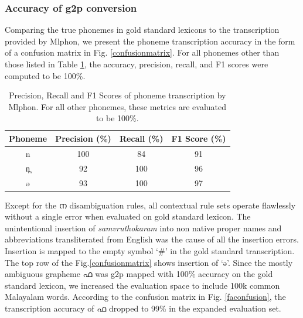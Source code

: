\documentclass{ieeeaccess}
\begin{document}
\subsubsection{Accuracy of g2p conversion }

Comparing the true phonemes in gold standard lexicons to the transcription provided by Mlphon, we present the phoneme transcription accuracy in the form of a confusion matrix in Fig. \ref{confusionmatrix}. For all phonemes other than those listed in Table \ref{precision}, the accuracy, precision, recall, and F1 scores were computed to be 100\%.
\vspace{0.2cm}

\begin{table}[h]
	\begin{center}
			\caption{Precision, Recall and F1 Scores of phoneme transcription by Mlphon. For all other phonemes, these metrics are evaluated to be 100\%.}
			\label{precision}
			\begin{tabular}{@{}cccc@{}}
				\hline\hline
				Phoneme  & Precision (\%) & Recall (\%) & F1 Score (\%) \\
				\hline
				{\ipa n} & 100      & 84   &  91     \\
				{\ipa n̪} &92     & 100   & 96   \\
				{\ipa ə} & 93     & 100   &  97     \\

				\hline
			\end{tabular}
	\end{center}
\end{table}


Except for the {\mal ന} disambiguation rules, all contextual rule sets operate flawlessly without a single error when evaluated on gold standard lexicon. The unintentional insertion of \textit{samvruthokaram} into non native proper names and abbreviations transliterated from English was the cause of all the insertion errors.  Insertion is mapped to the empty symbol `\#' in the gold standard transcription.  The top row of the Fig.\ref{confusionmatrix} shows insertion of `{\ipa ə}'. 
Since the mostly ambiguous  grapheme {\mal ഫ} was g2p mapped with 100\% accuracy on the gold standard lexicon, we increased the evaluation space to include 100k common Malayalam words.
According to the confusion matrix in Fig. \ref{faconfusion}, the transcription accuracy of {\mal ഫ} dropped to 99\% in the expanded evaluation set. 
\end{document}
